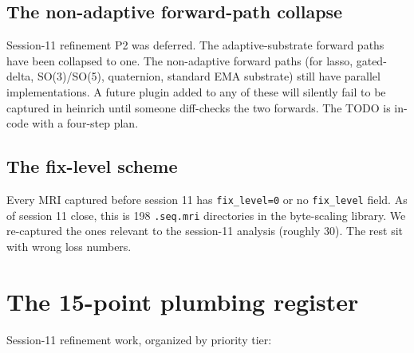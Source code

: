 \documentclass[11pt,openany]{book}
\begin{document}
\section{The non-adaptive forward-path collapse}

Session-11 refinement P2 was deferred. The adaptive-substrate forward
paths have been collapsed to one. The non-adaptive forward paths
(for lasso, gated-delta, SO(3)/SO(5), quaternion, standard EMA
substrate) still have parallel implementations. A future plugin added
to any of these will silently fail to be captured in heinrich until
someone diff-checks the two forwards. The TODO is in-code with a
four-step plan.

\section{The fix-level scheme}

Every MRI captured before session 11 has \texttt{fix\_level=0} or no
\texttt{fix\_level} field. As of session 11 close, this is 198
\texttt{.seq.mri} directories in the byte-scaling library. We
re-captured the ones relevant to the session-11 analysis (roughly 30).
The rest sit with wrong loss numbers.

\chapter{The 15-point plumbing register}
\label{chap:plumbing-register}

Session-11 refinement work, organized by priority tier:
\end{document}
